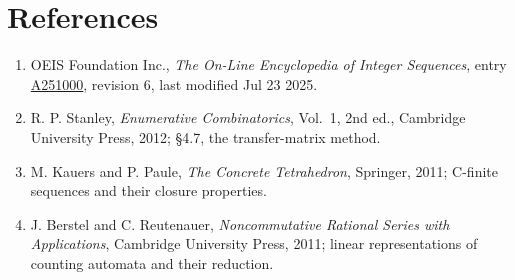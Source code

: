 \documentclass[11pt]{article}
\theoremstyle{definition}
\begin{document}
\section{References}

\begin{enumerate}

\item OEIS Foundation Inc., \emph{The On-Line Encyclopedia of Integer Sequences}, entry \href{https://oeis.org/A251000}{A251000}, revision 6, last modified Jul 23 2025.

\item R. P. Stanley, \emph{Enumerative Combinatorics}, Vol.~1, 2nd ed., Cambridge University Press, 2012; \S4.7, the transfer-matrix method.

\item M. Kauers and P. Paule, \emph{The Concrete Tetrahedron}, Springer, 2011; C-finite sequences and their closure properties.

\item J. Berstel and C. Reutenauer, \emph{Noncommutative Rational Series with Applications}, Cambridge University Press, 2011; linear representations of counting automata and their reduction.

\end{enumerate}
\end{document}
